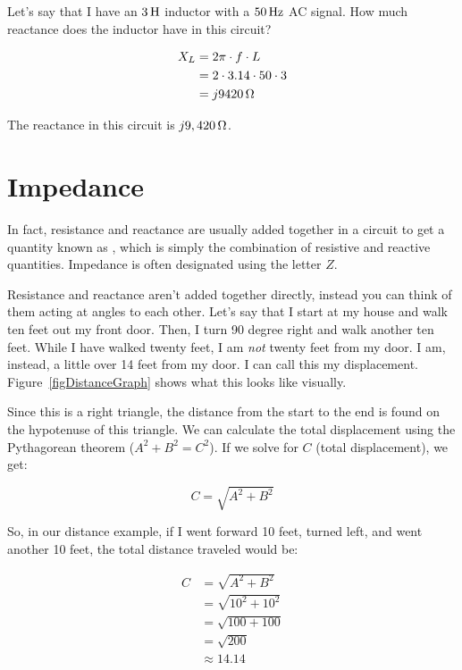 \begin{exampleprob}
Let's say that I have an $3\myhy$ inductor with a $50\,\si{\hertz}$ AC signal.
How much reactance does the inductor have in this circuit?

\begin{align*}
X_L &= 2\pi\cdot f\cdot L \\
    &= 2\cdot 3.14 \cdot 50 \cdot 3 \\
    &= j9420\,\si{\ohm}
\end{align*}

The reactance in this circuit is $j9,420\,\si{\ohm}$.
\end{exampleprob}

\section{Impedance}
\label{secImpedance}
In fact, resistance and reactance are usually added together in a circuit to get a quantity known as , which is simply the combination of resistive and reactive quantities.
Impedance is often designated using the letter $Z$.

Resistance and reactance aren't added together directly, instead you can think of them acting at angles to each other.
Let's say that I start at my house and walk ten feet out my front door.
Then, I turn 90 degree right and walk another ten feet.
While I have walked twenty feet, I am \emph{not} twenty feet from my door.
I am, instead, a little over 14 feet from my door.
I can call this my displacement.
Figure~\ref{figDistanceGraph} shows what this looks like visually.


Since this is a right triangle, the distance from the start to the end is found on the hypotenuse of this triangle.
We can calculate the total displacement using the Pythagorean theorem ($A^2 + B^2 = C^2$). 
If we solve for $C$ (total displacement), we get: 

\begin{equation}
\label{eqTotalDisplacement}
C = \sqrt{A^2 + B^2}
\end{equation}

So, in our distance example, if I went forward 10 feet, turned left, and went another 10 feet, the total distance traveled would be:

\begin{align*}
C &= \sqrt{A^2 + B^2} \\
  &= \sqrt{10^2 + 10^2} \\
  &= \sqrt{100 + 100} \\
  &= \sqrt{200} \\
  &\approx 14.14
\end{align*}

